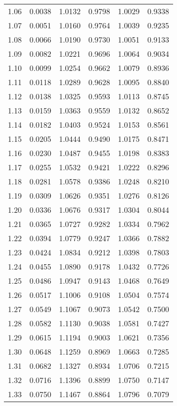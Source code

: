 \documentclass{article}
\begin{document}
\begin{longtable}{cccccc}
1.06 & 0.0038 & 1.0132 & 0.9798 & 1.0029 & 0.9338 \\
1.07 & 0.0051 & 1.0160 & 0.9764 & 1.0039 & 0.9235 \\
1.08 & 0.0066 & 1.0190 & 0.9730 & 1.0051 & 0.9133 \\
1.09 & 0.0082 & 1.0221 & 0.9696 & 1.0064 & 0.9034 \\
1.10 & 0.0099 & 1.0254 & 0.9662 & 1.0079 & 0.8936 \\
1.11 & 0.0118 & 1.0289 & 0.9628 & 1.0095 & 0.8840 \\
1.12 & 0.0138 & 1.0325 & 0.9593 & 1.0113 & 0.8745 \\
1.13 & 0.0159 & 1.0363 & 0.9559 & 1.0132 & 0.8652 \\
1.14 & 0.0182 & 1.0403 & 0.9524 & 1.0153 & 0.8561 \\
1.15 & 0.0205 & 1.0444 & 0.9490 & 1.0175 & 0.8471 \\
1.16 & 0.0230 & 1.0487 & 0.9455 & 1.0198 & 0.8383 \\
1.17 & 0.0255 & 1.0532 & 0.9421 & 1.0222 & 0.8296 \\
1.18 & 0.0281 & 1.0578 & 0.9386 & 1.0248 & 0.8210 \\
1.19 & 0.0309 & 1.0626 & 0.9351 & 1.0276 & 0.8126 \\
1.20 & 0.0336 & 1.0676 & 0.9317 & 1.0304 & 0.8044 \\
1.21 & 0.0365 & 1.0727 & 0.9282 & 1.0334 & 0.7962 \\
1.22 & 0.0394 & 1.0779 & 0.9247 & 1.0366 & 0.7882 \\
1.23 & 0.0424 & 1.0834 & 0.9212 & 1.0398 & 0.7803 \\
1.24 & 0.0455 & 1.0890 & 0.9178 & 1.0432 & 0.7726 \\
1.25 & 0.0486 & 1.0947 & 0.9143 & 1.0468 & 0.7649 \\
1.26 & 0.0517 & 1.1006 & 0.9108 & 1.0504 & 0.7574 \\
1.27 & 0.0549 & 1.1067 & 0.9073 & 1.0542 & 0.7500 \\
1.28 & 0.0582 & 1.1130 & 0.9038 & 1.0581 & 0.7427 \\
1.29 & 0.0615 & 1.1194 & 0.9003 & 1.0621 & 0.7356 \\
1.30 & 0.0648 & 1.1259 & 0.8969 & 1.0663 & 0.7285 \\
1.31 & 0.0682 & 1.1327 & 0.8934 & 1.0706 & 0.7215 \\
1.32 & 0.0716 & 1.1396 & 0.8899 & 1.0750 & 0.7147 \\
1.33 & 0.0750 & 1.1467 & 0.8864 & 1.0796 & 0.7079 \\

\end{longtable}
\end{document}
